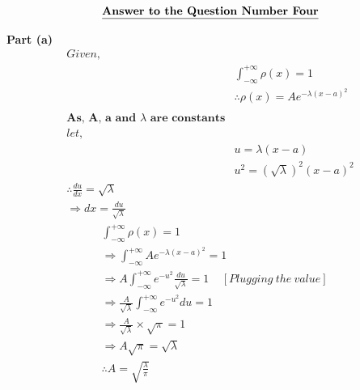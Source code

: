 \documentclass{article}
\begin{document}
\begin{homeworkProblem}
    \[      \textbf{\underline{Answer to the Question Number Four}}
    \]
    
    \textbf{Part (a)}
    \[
    \begin{split}
        Given,
        \\
        &\int_{-\infty}^{+\infty} \rho (x) = 1
        \\
        & \therefore \rho (x) = A e^{-\lambda (x-a)^2}
        \\ \\
        \textbf{As, A, a and $\lambda$ are constants}
        \\
        let,
        \\
        &u = \lambda (x-a)
        \\
        &u^2 = (\sqrt{\lambda})^2(x-a)^2
        \\
        \therefore \frac{du}{dx} = \sqrt{\lambda}
        \\
        \Rightarrow dx = \frac{du}{\sqrt{\lambda}}
    \end{split}
     \]
     \biggap
     \[ 
     \begin{split}
         & \int_{-\infty}^{+\infty} \rho (x) = 1
         \\
         & \Rightarrow \int_{-\infty}^{+\infty} A e^{-\lambda (x-a)^2} =1
         \\
         & \Rightarrow A \int_{-\infty}^{+\infty} e^{-u^2} \frac{du}{\sqrt{\lambda}} =1 \ \ \ \ \ [Plugging \ the \ value]
         \\
         & \Rightarrow \frac{A}{\sqrt{\lambda}} \int_{-\infty}^{+\infty} e^{-u^2} du = 1
         \\
         &\Rightarrow \frac{A}{\sqrt{\lambda}} \times \sqrt{\pi} = 1
         \\
         &\Rightarrow A \sqrt{\pi} = \sqrt{\lambda}
         \\
         &\therefore A = \sqrt{\frac{\lambda}{\pi}}
     \end{split}
     \]
     
\end{homeworkProblem}
\pagebreak
\end{document}
